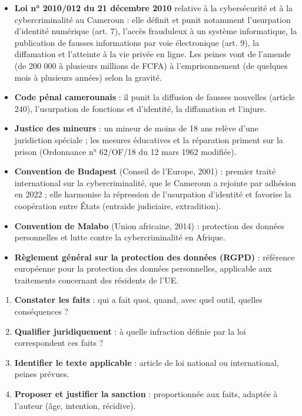 \documentclass[11pt]{article}
\newcommand{\cle}[1]{{\popxbold\color{popdark}#1}}
\begin{document}
\begin{aretenir}
\begin{itemize}
\item \textbf{Loi n° 2010/012 du 21 décembre 2010} relative à la cybersécurité et à la cybercriminalité au Cameroun : elle définit et punit notamment l'\cle{usurpation d'identité numérique} (art. 7), l'\cle{accès frauduleux} à un système informatique, la \cle{publication de fausses informations} par voie électronique (art. 9), la diffamation et l'atteinte à la vie privée en ligne. Les peines vont de l'amende (de 200 000 à plusieurs millions de FCFA) à l'emprisonnement (de quelques mois à plusieurs années) selon la gravité.
\item \textbf{Code pénal camerounais} : il punit la diffusion de fausses nouvelles (article 240), l'usurpation de fonctions et d'identité, la diffamation et l'injure.
\item \textbf{Justice des mineurs} : un mineur de moins de 18 ans relève d'une juridiction spéciale ; les mesures éducatives et la réparation priment sur la prison (Ordonnance n° 62/OF/18 du 12 mars 1962 modifiée).
\end{itemize}
\end{aretenir}

\begin{aretenir}
\begin{itemize}
\item \textbf{Convention de Budapest} (Conseil de l'Europe, 2001) : premier traité international sur la cybercriminalité, que le Cameroun a rejointe par adhésion en 2022 ; elle harmonise la répression de l'usurpation d'identité et favorise la coopération entre États (entraide judiciaire, extradition).
\item \textbf{Convention de Malabo} (Union africaine, 2014) : protection des données personnelles et lutte contre la cybercriminalité en Afrique.
\item \textbf{Règlement général sur la protection des données (RGPD)} : référence européenne pour la protection des données personnelles, applicable aux traitements concernant des résidents de l'UE.
\end{itemize}
\end{aretenir}

\begin{methode}
\begin{enumerate}
\item \textbf{Constater les faits} : qui a fait quoi, quand, avec quel outil, quelles conséquences ?
\item \textbf{Qualifier juridiquement} : à quelle infraction définie par la loi correspondent ces faits ?
\item \textbf{Identifier le texte applicable} : article de loi national ou international, peines prévues.
\item \textbf{Proposer et justifier la sanction} : proportionnée aux faits, adaptée à l'auteur (âge, intention, récidive).
\end{enumerate}
\end{methode}
\end{document}
